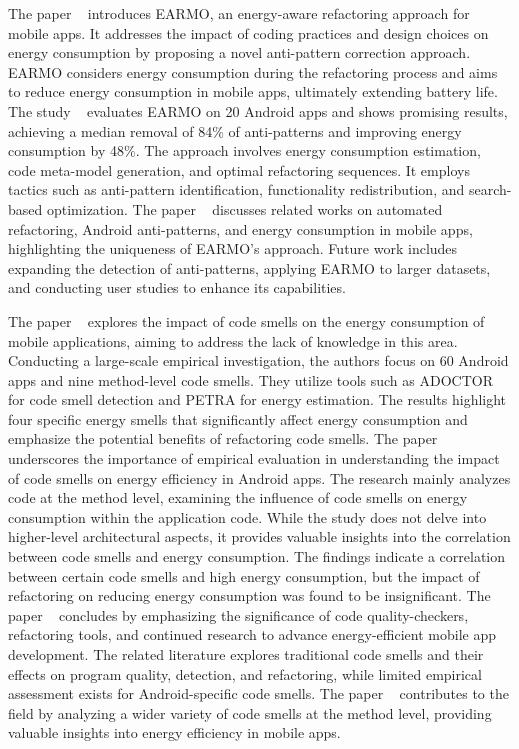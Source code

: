 The paper ~\cite{DBLP:journals/tse/MoralesSKCA18} introduces EARMO, an energy-aware refactoring approach for mobile apps. It addresses the impact of coding practices and design choices on energy consumption by proposing a novel anti-pattern correction approach. EARMO considers energy consumption during the refactoring process and aims to reduce energy consumption in mobile apps, ultimately extending battery life. The study ~\cite{DBLP:journals/tse/MoralesSKCA18} evaluates EARMO on 20 Android apps and shows promising results, achieving a median removal of 84\% of anti-patterns and improving energy consumption by 48\%. The approach involves energy consumption estimation, code meta-model generation, and optimal refactoring sequences. It employs tactics such as anti-pattern identification, functionality redistribution, and search-based optimization. The paper ~\cite{DBLP:journals/tse/MoralesSKCA18} discusses related works on automated refactoring, Android anti-patterns, and energy consumption in mobile apps, highlighting the uniqueness of EARMO's approach. Future work includes expanding the detection of anti-patterns, applying EARMO to larger datasets, and conducting user studies to enhance its capabilities.\par


The paper ~\cite{DBLP:journals/infsof/PalombaNPZL19} explores the impact of code smells on the energy consumption of mobile applications, aiming to address the lack of knowledge in this area. Conducting a large-scale empirical investigation, the authors focus on 60 Android apps and nine method-level code smells. They utilize tools such as ADOCTOR for code smell detection and PETRA for energy estimation. The results highlight four specific energy smells that significantly affect energy consumption and emphasize the potential benefits of refactoring code smells. The paper ~\cite{DBLP:journals/infsof/PalombaNPZL19} underscores the importance of empirical evaluation in understanding the impact of code smells on energy efficiency in Android apps. The research mainly analyzes code at the method level, examining the influence of code smells on energy consumption within the application code. While the study does not delve into higher-level architectural aspects, it provides valuable insights into the correlation between code smells and energy consumption. The findings indicate a correlation between certain code smells and high energy consumption, but the impact of refactoring on reducing energy consumption was found to be insignificant. The paper ~\cite{DBLP:journals/infsof/PalombaNPZL19} concludes by emphasizing the significance of code quality-checkers, refactoring tools, and continued research to advance energy-efficient mobile app development. The related literature explores traditional code smells and their effects on program quality, detection, and refactoring, while limited empirical assessment exists for Android-specific code smells. The paper ~\cite{DBLP:journals/infsof/PalombaNPZL19} contributes to the field by analyzing a wider variety of code smells at the method level, providing valuable insights into energy efficiency in mobile apps.\par


